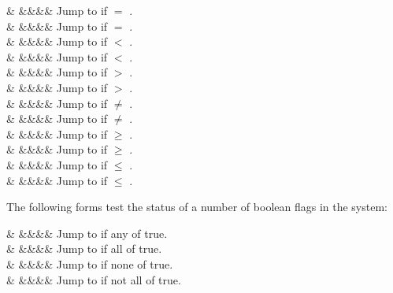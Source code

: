 \documentclass[letterpaper,twoside,onecolumn,openright,final]{memoir}
\begin{document}
{\begin{opdesc}
   &  &&&\z{,\$,\$}& Jump to  if  $=$ .\\
   &  &&&\z{,\$,\#}& Jump to  if  $=$ .\\
   &  &&&\z{,\$,\$}& Jump to  if  $<$ .\\
   &  &&&\z{,\$,\#}& Jump to  if  $<$ .\\
   &  &&&\z{,\$,\$}& Jump to  if  $>$ .\\
   &  &&&\z{,\$,\#}& Jump to  if  $>$ .\\
   &  &&&\z{,\$,\$}& Jump to  if  $\ne$ .\\
   &  &&&\z{,\$,\#}& Jump to  if  $\ne$ .\\
   &  &&&\z{,\$,\$}& Jump to  if  $\ge$ .\\
   &  &&&\z{,\$,\#}& Jump to  if  $\ge$ .\\
   &  &&&\z{,\$,\$}& Jump to  if  $\le$ .\\
   &  &&&\z{,\$,\#}& Jump to  if  $\le$ .\\
\end{opdesc}

The following forms test the status of a number of boolean flags in the system:

\begin{opdesc}
   &  &&&\z{,}& Jump to  if any of  true.\\
   &  &&&\z{,}& Jump to  if all of  true.\\
   &  &&&\z{,}& Jump to  if none of  true.\\
   &  &&&\z{,}& Jump to  if not all of  true.\\
\end{opdesc}

}
\end{document}
